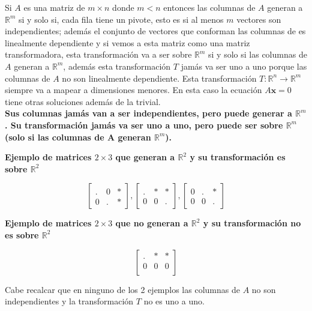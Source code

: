 \documentclass{article}
\begin{document}
\begin{tcolorbox}[colback=red!10!white, colframe=red!70!black, title=Puntos Importantes cuando $m < n$]
    Si $A$ es una matriz de $m \times n$ donde $m < n$ entonces las columnas de $A$ generan a $\mathbb{R}^m$ si y solo si, cada fila tiene un pivote, esto es si al menos $m$ vectores son independientes; además el conjunto de vectores que conforman las columnas de es linealmente dependiente y si vemos a esta matriz como una matriz transformadora, esta transformación va a ser sobre $\mathbb{R}^m$ si y solo si las columnas de $A$ generan a $\mathbb{R}^m$, además esta transformación $T$ jamás va ser uno a uno porque las columnas de $A$ no son linealmente dependiente. Esta transformación $T: \mathbb{R}^n \rightarrow \mathbb{R}^m$ siempre va a mapear a dimensiones menores. En esta caso la ecuación $A\mathbf{x} = 0$ tiene otras soluciones además de la trivial.\\

    \textbf{Sus columnas jamás van a ser independientes, pero puede generar a $\mathbb{R}^m$. Su transformación jamás va ser uno a uno, pero puede ser sobre $\mathbb{R}^m$ (solo si las columnas de A generan $\mathbb{R}^m$).}\\

    \begin{large}
        \textbf{Ejemplo de matrices $2 \times 3$ que generan a $\mathbb{R}^2$ y su transformación es sobre $\mathbb{R}^2$}
    \end{large}

    \begin{equation*}
        \begin{bmatrix}
            . & 0 & * \\
            0 & . & *
        \end{bmatrix}, 
        \begin{bmatrix}
            . & * & * \\
            0 & 0 & .
        \end{bmatrix},
        \begin{bmatrix}
            0 & . & * \\
            0 & 0 & .
        \end{bmatrix}
    \end{equation*}
    
    \begin{large}
        \textbf{Ejemplo de matrices $2 \times 3$ que no generan a $\mathbb{R}^2$ y su transformación no es sobre $\mathbb{R}^2$}
    \end{large}

    $$\begin{bmatrix}
        . & * & * \\
        0 & 0 & 0 \\ 
    \end{bmatrix}$$

Cabe recalcar que en ninguno de los 2 ejemplos las columnas de $A$ no son independientes y la transformación $T$ no es uno a uno.
\end{tcolorbox}
\end{document}
